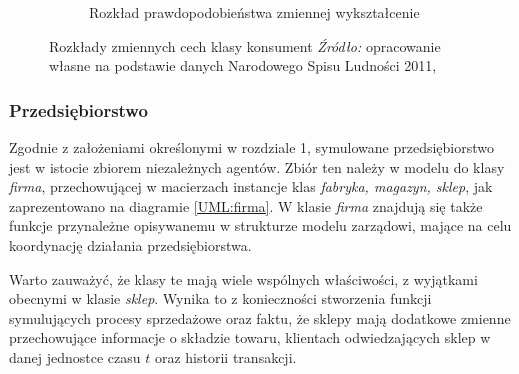 \documentclass[polish, twoside, 12pt, a4paper]{article}
\theoremstyle{definition}
\theoremstyle{plain}
\theoremstyle{remark}
\begin{document}
\begin{figure}[hbt]
\begin{subfigure}[t]{0.45\textwidth}
    \caption{Rozkład prawdopodobieństwa zmiennej wykształcenie}
    \label{fig:wyksztalcenie}
  \end{subfigure}
  \captionsetup{margin=10pt,font=small,labelfont=bf,width=.8\textwidth}
  \caption[Rozkłady zmiennych cech klasy konsument]{Rozkłady zmiennych cech klasy konsument \textit{Źródło:} opracowanie własne na podstawie danych Narodowego Spisu Ludności 2011, \cite{GUS2011}}\label{fig:cechykonsumenta}
\end{figure}


\subsubsection{Przedsiębiorstwo}

Zgodnie z założeniami określonymi w rozdziale 1, symulowane przedsiębiorstwo jest w istocie zbiorem niezależnych agentów. Zbiór ten należy w modelu do klasy \textit{firma}, przechowującej w macierzach instancje klas \textit{fabryka, magazyn, sklep}, jak zaprezentowano na diagramie \ref{UML:firma}. W klasie \textit{firma} znajdują się także funkcje przynależne opisywanemu w strukturze modelu zarządowi, mające na celu koordynację działania przedsiębiorstwa. 

Warto zauważyć, że klasy te mają wiele wspólnych właściwości, z wyjątkami obecnymi w klasie \textit{sklep}. Wynika to z konieczności stworzenia funkcji symulujących procesy sprzedażowe oraz faktu, że sklepy mają dodatkowe zmienne przechowujące informacje o składzie towaru, klientach odwiedzających sklep w danej jednostce czasu $t$ oraz historii transakcji.  
\end{document}
